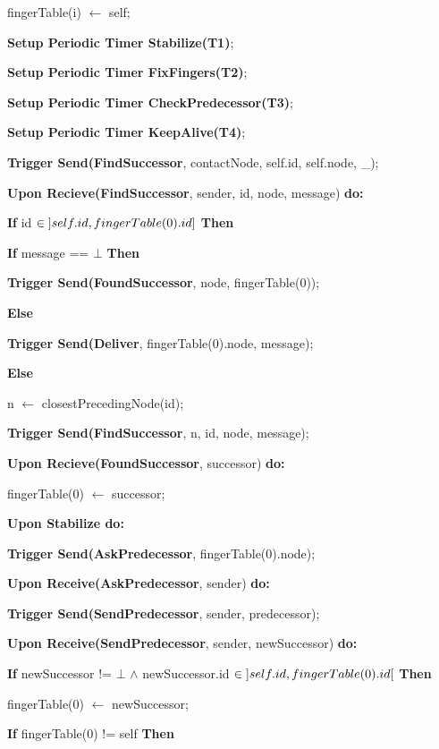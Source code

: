 \documentclass[12pt]{article}
\begin{document}
\qquad \qquad fingerTable(i) $\leftarrow$ self;

\qquad \textbf{Setup Periodic Timer Stabilize(T1)};

\qquad \textbf{Setup Periodic Timer FixFingers(T2)};

\qquad \textbf{Setup Periodic Timer CheckPredecessor(T3)};

\qquad \textbf{Setup Periodic Timer KeepAlive(T4)};

\qquad \textbf{Trigger Send(FindSuccessor}, contactNode, self.id, self.node, \_);



\bigbreak
\textbf{Upon Recieve(FindSuccessor}, sender, id, node, message) \textbf{do:}

\qquad \textbf{If} id $\in \interval[open left]{self.id}{fingerTable(0).id}$ \textbf{Then}

\qquad \qquad \textbf{If} message == $\bot$ \textbf{Then}

\qquad \qquad \qquad \textbf{Trigger Send(FoundSuccessor}, node, fingerTable(0));

\qquad \qquad \textbf{Else}

\qquad \qquad \qquad \textbf{Trigger Send(Deliver}, fingerTable(0).node, message);

\qquad \textbf{Else}

\qquad \qquad n $\leftarrow$ closestPrecedingNode(id);

\qquad \qquad \textbf{Trigger Send(FindSuccessor}, n, id, node, message);


\bigbreak
\textbf{Upon Recieve(FoundSuccessor}, successor) \textbf{do:}

\qquad fingerTable(0) $\leftarrow$ successor;

\bigbreak
\textbf{Upon Stabilize do:}

\qquad \textbf{Trigger Send(AskPredecessor}, fingerTable(0).node);


\bigbreak
\textbf{Upon Receive(AskPredecessor}, sender) \textbf{do:}

\qquad \textbf{Trigger Send(SendPredecessor}, sender, predecessor);

\bigbreak
\textbf{Upon Receive(SendPredecessor}, sender, newSuccessor) \textbf{do:}

\qquad \textbf{If} newSuccessor != $\bot$ $\wedge$ newSuccessor.id $\in \interval[open]{self.id}{fingerTable(0).id}$ \textbf{Then}

\qquad \qquad fingerTable(0) $\leftarrow$ newSuccessor;

\qquad \textbf{If} fingerTable(0) != self \textbf{Then}
\end{document}
